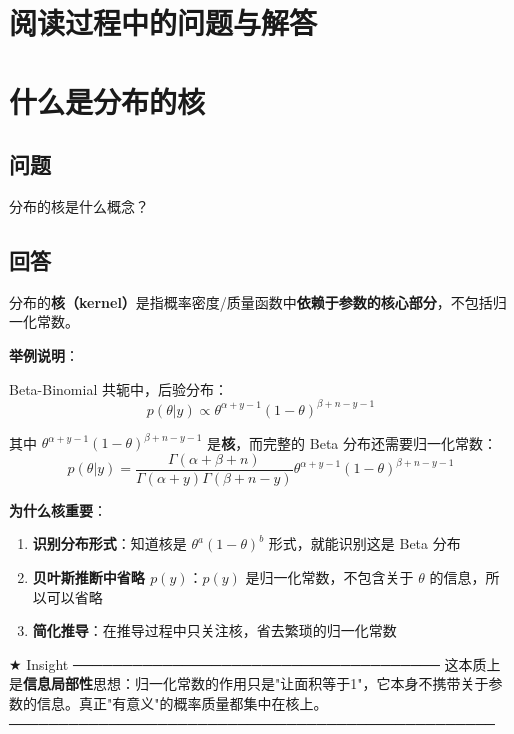 
\section{阅读过程中的问题与解答}


\section{什么是分布的核}\label{sec:qa:DistributionKernel}

\subsection{问题}
分布的核是什么概念？

\subsection{回答}
分布的\textbf{核（kernel）}是指概率密度/质量函数中\textbf{依赖于参数的核心部分}，不包括归一化常数。

\textbf{举例说明}：

Beta-Binomial 共轭中，后验分布：
\[
p(\theta|y) \propto \theta^{\alpha+y-1}(1-\theta)^{\beta+n-y-1}
\]

其中 $\theta^{\alpha+y-1}(1-\theta)^{\beta+n-y-1}$ 是\textbf{核}，而完整的 Beta 分布还需要归一化常数：
\[
p(\theta|y) = \frac{\Gamma(\alpha+\beta+n)}{\Gamma(\alpha+y)\Gamma(\beta+n-y)} \theta^{\alpha+y-1}(1-\theta)^{\beta+n-y-1}
\]

\textbf{为什么核重要}：

\begin{enumerate}
  \item \textbf{识别分布形式}：知道核是 $\theta^a(1-\theta)^b$ 形式，就能识别这是 Beta 分布
  \item \textbf{贝叶斯推断中省略 $p(y)$}：$p(y)$ 是归一化常数，不包含关于 $\theta$ 的信息，所以可以省略
  \item \textbf{简化推导}：在推导过程中只关注核，省去繁琐的归一化常数
\end{enumerate}

★ Insight ─────────────────────────────────────
这本质上是\textbf{信息局部性}思想：归一化常数的作用只是"让面积等于1"，它本身不携带关于参数的信息。真正"有意义"的概率质量都集中在核上。
─────────────────────────────────────────────────

